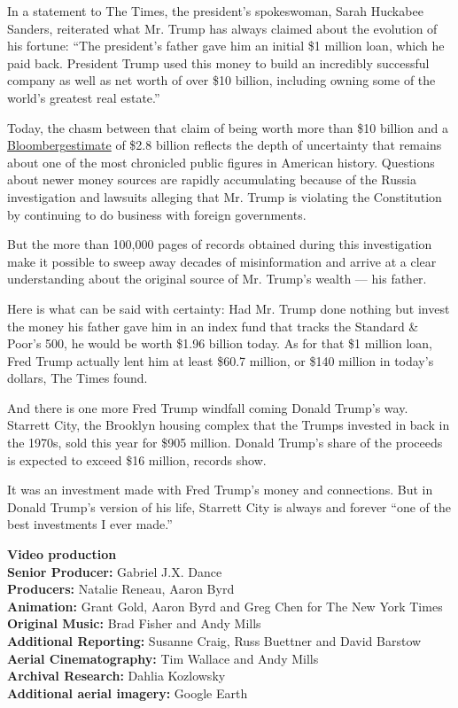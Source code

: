 In a statement to The Times, the president's spokeswoman, Sarah Huckabee
Sanders, reiterated what Mr. Trump has always claimed about the
evolution of his fortune: ``The president's father gave him an initial
\$1 million loan, which he paid back. President Trump used this money to
build an incredibly successful company as well as net worth of over \$10
billion, including owning some of the world's greatest real estate.''

Today, the chasm between that claim of being worth more than \$10
billion and a
\href{https://www.bloomberg.com/news/articles/2018-05-31/trump-s-net-worth-slides-to-2-8-billion-lowest-since-campaign}{Bloomberg}\href{https://www.bloomberg.com/news/articles/2018-05-31/trump-s-net-worth-slides-to-2-8-billion-lowest-since-campaign}{estimate}
of \$2.8 billion reflects the depth of uncertainty that remains about
one of the most chronicled public figures in American history. Questions
about newer money sources are rapidly accumulating because of the Russia
investigation and lawsuits alleging that Mr. Trump is violating the
Constitution by continuing to do business with foreign governments.

But the more than 100,000 pages of records obtained during this
investigation make it possible to sweep away decades of misinformation
and arrive at a clear understanding about the original source of Mr.
Trump's wealth --- his father.

Here is what can be said with certainty: Had Mr. Trump done nothing but
invest the money his father gave him in an index fund that tracks the
Standard \& Poor's 500, he would be worth \$1.96 billion today. As for
that \$1 million loan, Fred Trump actually lent him at least \$60.7
million, or \$140 million in today's dollars, The Times found.

And there is one more Fred Trump windfall coming Donald Trump's way.
Starrett City, the Brooklyn housing complex that the Trumps invested in
back in the 1970s, sold this year for \$905 million. Donald Trump's
share of the proceeds is expected to exceed \$16 million, records show.

It was an investment made with Fred Trump's money and connections. But
in Donald Trump's version of his life, Starrett City is always and
forever ``one of the best investments I ever made.''

\textbf{Video production\\
Senior Producer:} Gabriel J.X. Dance\\
\textbf{Producers:} Natalie Reneau, Aaron Byrd\\
\textbf{Animation:} Grant Gold, Aaron Byrd and Greg Chen for The New
York Times\\
\textbf{Original Music:} Brad Fisher and Andy Mills\\
\textbf{Additional Reporting:} Susanne Craig, Russ Buettner and David
Barstow\\
\textbf{Aerial Cinematography:} Tim Wallace and Andy Mills\\
\textbf{Archival Research:} Dahlia Kozlowsky\\
\textbf{\textbf{Additional aerial imagery}:} Google Earth

